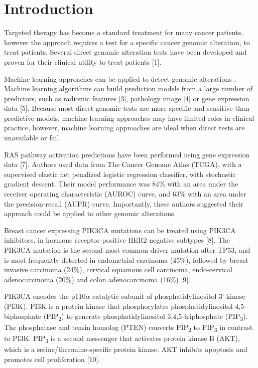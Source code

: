 \documentclass[10pt,letterpaper]{article}
\begin{document}

\linenumbers

\hypertarget{introduction}{%
\section{Introduction}\label{introduction}}

Targeted therapy has become a standard treatment for many cancer
patients, however the approach requires a test for a specific cancer
genomic alteration, to treat patients. Several direct genomic alteration
tests have been developed and proven for their clinical utility to treat
patients {[}1{]}.

Machine learning approaches can be applied to detect genomic alterations
. Machine learning algorithms can build prediction models from a large
number of predictors, such as radiomic features {[}3{]}, pathology image
{[}4{]} or gene expression data {[}5{]}. Because most direct genomic
tests are more specific and sensitive than predictive models, machine
learning approaches may have limited roles in clinical practice,
however, machine learning approaches are ideal when direct tests are
unavailable or fail.

RAS pathway activation predictions have been performed using gene
expression data {[}7{]}. Authors used data from The Cancer Genome Atlas
(TCGA), with a supervised elastic net penalized logistic regression
classifier, with stochastic gradient descent. Their model performance
was 84\% with an area under the receiver operating characteristic
(AUROC) curve, and 63\% with an area under the precision-recall (AUPR)
curve. Importantly, these authors suggested their approach could be
applied to other genomic alterations.

Breast cancer expressing PIK3CA mutations can be treated using PIK3CA
inhibitors, in hormone receptor-positive HER2 negative subtypes {[}8{]}.
The PIK3CA mutation is the second most common driver mutation after
TP53, and is most frequently detected in endometrial carcinoma (45\%),
followed by breast invasive carcinoma (24\%), cervical squamous cell
carcinoma, endo-cervical adenocarcinoma (20\%) and colon adenocarcinoma
(16\%) {[}9{]}.

PIK3CA encodes the p110\(\alpha\) catalytic subunit of
phosphatidylinositol 3′-kinase (PI3K). PI3K is a protein kinase that
phosphorylates phosphatidylinositol 4,5-biphosphate
(PIP\textsubscript{2}) to generate phosphatidylinositol
3,4,5-triphosphate (PIP\textsubscript{3}). The phosphatase and tensin
homolog (PTEN) converts PIP\textsubscript{2} to PIP\textsubscript{3} in
contrast to PI3K. PIP\textsubscript{3} is a second messenger that
activates protein kinase B (AKT), which is a serine/threonine-specific
protein kinase. AKT inhibits apoptosis and promotes cell proliferation
{[}10{]}.
\end{document}
